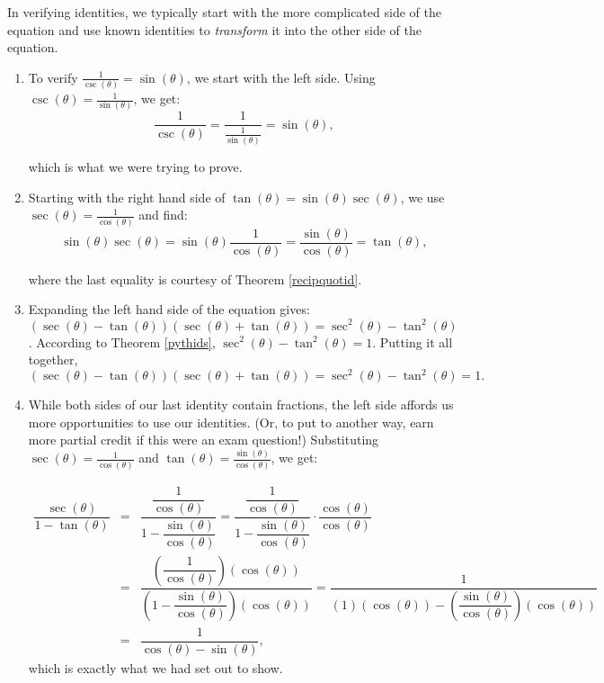 {In verifying identities, we typically start with the more complicated side of the equation and use known identities to \textit{transform} it into the other side of the equation. 

\begin{enumerate} 

\item  To verify $\frac{1}{\csc(\theta)} = \sin(\theta)$, we start with the left side.  Using $\csc(\theta) = \frac{1}{\sin(\theta)}$, we get:  \[ \dfrac{1}{\csc(\theta)} = \dfrac{1}{\frac{1}{\sin(\theta)}} = \sin(\theta),\]

which is what we were trying to prove.

\item Starting with the right hand side of $\tan(\theta) = \sin(\theta) \sec(\theta)$, we use $\sec(\theta) = \frac{1}{\cos(\theta)}$ and find:  \[ \sin(\theta) \sec(\theta) = \sin(\theta) \dfrac{1}{\cos(\theta)} = \dfrac{\sin(\theta)}{\cos(\theta)} = \tan(\theta),\]

where the last equality is courtesy of Theorem \ref{recipquotid}.

\item Expanding the left hand side of the equation gives:  $(\sec(\theta) - \tan(\theta)) (\sec(\theta) + \tan(\theta)) = \sec^{2}(\theta) - \tan^{2}(\theta)$.  According to Theorem \ref{pythids}, $\sec^{2}(\theta) - \tan^{2}(\theta) = 1$.  Putting it all together, \[(\sec(\theta) - \tan(\theta)) (\sec(\theta) + \tan(\theta)) = \sec^{2}(\theta) - \tan^{2}(\theta)  = 1.\]


\item  While both sides of our last identity contain fractions, the left side affords us more opportunities to use our identities. (Or, to put to another way, earn more partial credit if this were an exam question!) Substituting $\sec(\theta) = \frac{1}{\cos(\theta)}$ and $\tan(\theta) = \frac{\sin(\theta)}{\cos(\theta)}$, we get:


\[ \begin{array}{rcl} \dfrac{\sec(\theta)}{1 - \tan(\theta)} & = & \dfrac{ \dfrac{1}{\cos(\theta)}}{1 - \dfrac{\sin(\theta)}{\cos(\theta)}} = \dfrac{ \dfrac{1}{\cos(\theta)}}{1 - \dfrac{\sin(\theta)}{\cos(\theta)}} \cdot \dfrac{\cos(\theta)}{\cos(\theta)} \\ [.4in]
 & = & \dfrac{\left( \dfrac{1}{\cos(\theta)} \right) ( \cos(\theta) )}{\left(1 - \dfrac{\sin(\theta)}{\cos(\theta)}\right)(\cos(\theta))} = \dfrac{1}{(1)(\cos(\theta)) - \left(\dfrac{\sin(\theta)}{\cos(\theta)}\right)(\cos(\theta))} \\ [.4in]
                                                           & = & \dfrac{1}{\cos(\theta) - \sin(\theta)}, \end{array} \]
which is exactly what we had set out to show.  


\end{enumerate}}
